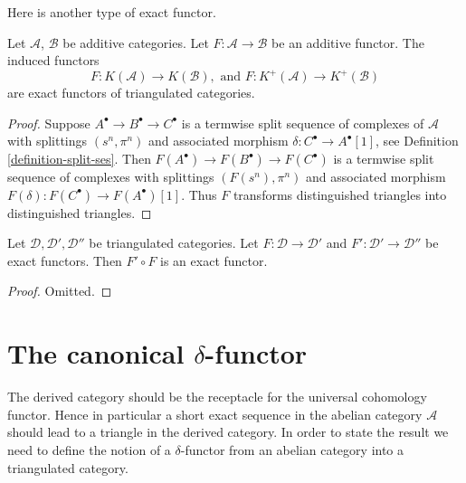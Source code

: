 \noindent
Here is another type of exact functor.

\begin{lemma}
\label{lemma-additive-exact-homotopy-category}
Let $\mathcal{A}$, $\mathcal{B}$ be additive categories.
Let $F : \mathcal{A} \to \mathcal{B}$ be an additive functor.
The induced functors
$$
F : K(\mathcal{A}) \longrightarrow K(\mathcal{B}),
\text{ and }
F : K^{+}(\mathcal{A}) \longrightarrow K^{+}(\mathcal{B})
$$
are exact functors of triangulated categories.
\end{lemma}

\begin{proof}
Suppose $A^\bullet \to B^\bullet \to C^\bullet$
is a termwise split sequence of complexes of $\mathcal{A}$ with splittings
$(s^n, \pi^n)$ and associated morphism $\delta : C^\bullet \to A^\bullet[1]$,
see Definition \ref{definition-split-ses}. Then
$F(A^\bullet) \to F(B^\bullet) \to F(C^\bullet)$
is a termwise split sequence of complexes with splittings
$(F(s^n), \pi^n)$ and associated morphism
$F(\delta) : F(C^\bullet) \to F(A^\bullet)[1]$.
Thus $F$ transforms distinguished triangles into distinguished triangles.
\end{proof}

\begin{lemma}
\label{lemma-composition-exact}
Let $\mathcal{D}, \mathcal{D}', \mathcal{D}''$ be triangulated categories.
Let $F : \mathcal{D} \to \mathcal{D}'$ and
$F' : \mathcal{D}' \to \mathcal{D}''$ be exact functors.
Then $F' \circ F$ is an exact functor.
\end{lemma}

\begin{proof}
Omitted.
\end{proof}











\section{The canonical $\delta$-functor}
\label{section-canonical-delta-functor}

\noindent
The derived category should be the receptacle for the universal
cohomology functor. Hence in particular a short exact sequence
in the abelian category $\mathcal{A}$ should lead to a triangle
in the derived category. In order to state the result we need to
define the notion of a $\delta$-functor from an abelian category
into a triangulated category.

